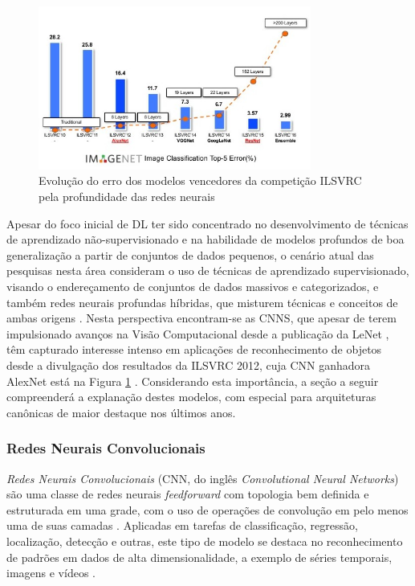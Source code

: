 \begin{figure}[ht]
	\centering
	\caption{Evolução do erro dos modelos vencedores da competição ILSVRC pela profundidade das redes neurais \cite{dl_ILSVRC, ImagenetChall}}
	\label{fig:compara_redes_ilsvrc}
	\includegraphics[width=0.8\textwidth]{img/compara_redes_ilsvrc.png}
\end{figure}

Apesar do foco inicial de DL ter sido concentrado no desenvolvimento de técnicas de aprendizado não-supervisionado e na habilidade de modelos profundos de boa generalização a partir de conjuntos de dados pequenos, o cenário atual das pesquisas nesta área consideram o uso de técnicas de aprendizado supervisionado, visando o endereçamento de conjuntos de dados massivos e categorizados, e também redes neurais profundas híbridas, que misturem técnicas e conceitos de ambas origens \cite{deng2014deep,goodfellow2016deep}. Nesta perspectiva encontram-se as CNNS, que apesar de terem impulsionado avanços na Visão Computacional desde a publicação da LeNet \cite{lenet}, têm capturado interesse intenso em aplicações de reconhecimento de objetos desde a divulgação dos resultados da ILSVRC 2012, cuja CNN ganhadora AlexNet \cite{alexnet} está na Figura \ref{fig:compara_redes_ilsvrc} \cite{deng2014deep}. Considerando esta importância, a seção a seguir compreenderá a explanação destes modelos, com especial para arquiteturas canônicas de maior destaque nos últimos anos.

\subsubsection{Redes Neurais Convolucionais} \label{subsubsec:rnc}

\emph{Redes Neurais Convolucionais} (CNN, do inglês \emph{Convolutional Neural Networks}) são uma classe de redes neurais \emph{feedforward} com topologia bem definida e estruturada em uma grade, com o uso de operações de convolução em pelo menos uma de suas camadas \cite{goodfellow2016deep}. Aplicadas em tarefas de classificação, regressão, localização, detecção e outras, este tipo de modelo se destaca no reconhecimento de padrões em dados de alta dimensionalidade, a exemplo de séries temporais, imagens e vídeos \cite{Khan:Livro}.

